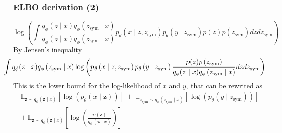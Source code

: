 \documentclass[10pt,xcolor={dvipsnames}]{beamer}
\begin{document}
\begin{frame}
    \frametitle{ELBO derivation (2)}
    {\small
    $$
        \log \left(\int \frac{q_{\phi}(z \mid x) q_{\phi}\left(z_{\text {sym}} \mid x\right)}{q_{\phi}(z \mid x) q_{\phi}\left(z_{\text {sym}} \mid x\right)} p_{\theta}\left(x \mid z, z_{\text {sym}}\right) p_{\theta}\left(y \mid z_{\text {sym}}\right) p(z) p\left(z_{\text {sym}}\right) d z d z_{\text {sym}}\right)
    $$
    }
    By Jensen's inequality
    {\small
    $$
        \hspace{-0.5cm}\int q_{\phi}(z \mid x) q_{\phi}\left(z_{\text {sym}} \mid x\right) \log \left(p_{\theta}\left(x \mid z, z_{\text {sym}}\right) p_{\theta}\left(y \mid z_{\text {sym}}\right) \frac{p(z) p\left(z_{\text {sym}}\right)}{q_{\phi}(z \mid x) q_{\phi}\left(z_{\text {sym}} \mid x\right)} d z d z_{\text {sym}}\right)
    $$
    }
    This is the lower bound for the log-likelihood of $x$ and $y$, that can be rewrited as
    \begin{multline*}
        \mathbb{E}_{\mathbf{z} \sim q_{\phi}(\mathbf{z} \mid x)}\left[\log \left(p_{\theta}(x \mid \mathbf{z})\right)\right] ~
        + ~ \mathbb{E}_{z_{\text {sym}} \sim q_{\phi}\left(z_{\text {sym}} \mid x\right)}\left[\log \left(p_{\theta}\left(y \mid z_{\text {sym}}\right)\right)\right]\\
        + ~ \mathbb{E}_{\mathbf{z} \sim q_{\phi}(\mathbf{z} \mid x)}\left[\log \left(\frac{p(\mathbf{z})}{q_{\phi}(\mathbf{z} \mid x)}\right)\right]
    \end{multline*}
\end{frame}
\end{document}
